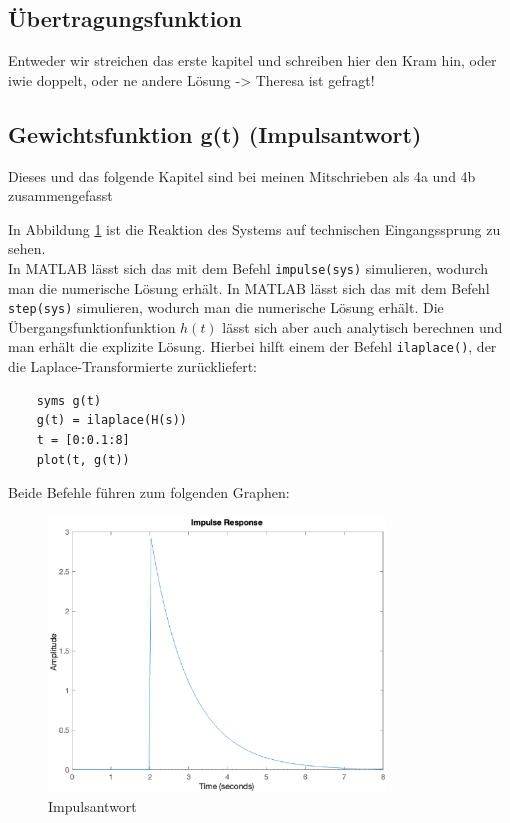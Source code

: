 \subsection{Übertragungsfunktion}
Entweder wir streichen das erste kapitel und schreiben hier den Kram hin, oder iwie doppelt, oder ne andere Lösung -> Theresa ist gefragt!

\subsection{Gewichtsfunktion g(t) (Impulsantwort)}
Dieses und das folgende Kapitel sind bei meinen Mitschrieben als 4a und 4b zusammengefasst


In Abbildung \ref{fig:impuls} ist die Reaktion des Systems auf technischen Eingangssprung zu sehen.
\\
In MATLAB lässt sich das mit dem Befehl \texttt{impulse(sys)} simulieren, wodurch man die numerische Lösung erhält. In MATLAB lässt sich das mit dem Befehl \texttt{step(sys)} simulieren, wodurch man die numerische Lösung erhält. Die Übergangsfunktionfunktion $h(t)$ lässt sich aber auch analytisch berechnen und man erhält die explizite Lösung. Hierbei hilft einem der Befehl \texttt{ilaplace()}, der die Laplace-Transformierte zurückliefert:
\begin{lstlisting}
    syms g(t)
    g(t) = ilaplace(H(s))
    t = [0:0.1:8]
    plot(t, g(t))
\end{lstlisting}

Beide Befehle führen zum folgenden Graphen:



\begin{figure}[H]
    \label{fig:impuls}
    \centering
    \includegraphics[width=0.8\textwidth]{Bilder/ImpulsAntwortPT1Tt.eps}
    \caption{Impulsantwort}
 \end{figure}

